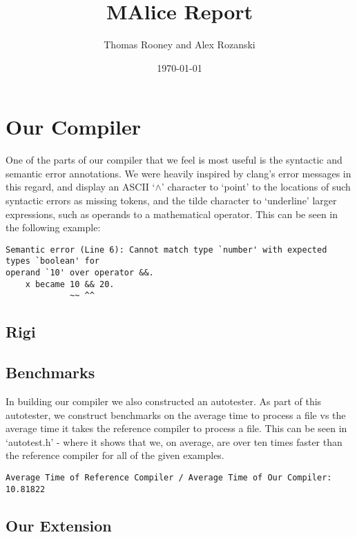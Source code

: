 \documentclass[a4wide, 11pt]{article}
\begin{document}
\title{MAlice Report}

\author{Thomas Rooney and Alex Rozanski}

\date{\today}

\maketitle

\section{Our Compiler}

One of the parts of our compiler that we feel is most useful is the syntactic and semantic error annotations. We were heavily inspired by clang's error messages in this regard, and display an ASCII `$\wedge$' character to `point' to the locations of such syntactic errors as missing tokens, and the tilde character to `underline' larger expressions, such as operands to a mathematical operator. This can be seen in the following example:

\begin{verbatim}
Semantic error (Line 6): Cannot match type `number' with expected types `boolean' for
operand `10' over operator &&.
    x became 10 && 20.
             ~~ ^^  
\end{verbatim}

\subsection{Rigi}

\subsection{Benchmarks}

In building our compiler we also constructed an autotester. As part of this autotester, we construct benchmarks on the average time to process a file vs the average time it takes the reference compiler to process a file. This can be seen in `autotest.h' - where it shows that we, on average, are over ten times faster than the reference compiler for all of the given examples.
\begin{verbatim}
Average Time of Reference Compiler / Average Time of Our Compiler: 10.81822
\end{verbatim}

\subsection{Our Extension}
\end{document}
